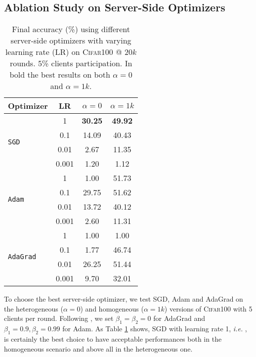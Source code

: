\subsection{Ablation Study on Server-Side Optimizers}
\label{app:server_optims}
\begin{table}[t]\centering
\caption{Final accuracy (\%) using different server-side optimizers with varying learning rate (LR) on \textsc{Cifar100} @ $20k$ rounds. 5\% clients participation. In bold the best results on both $\alpha=0$ and $\alpha=1k$.}\label{tab:server_optim}
\scriptsize
\setlength\tabcolsep{0.5cm}
    \begin{tabular}{lccc}
    \toprule
    Optimizer & LR & $\alpha=0$ & $\alpha=1k$\\
    \midrule
    \multirow{4}{*}{\texttt{SGD}} & 1 &\textbf{30.25}&\textbf{49.92}\\
    & 0.1 & 14.09 & 40.43\\
    & 0.01 & 2.67&11.35\\
    & 0.001 & 1.20 &1.12\\\midrule
    \multirow{4}{*}{\texttt{Adam}} & 1 & 1.00&{51.73}\\
    & 0.1 & 29.75&51.62\\
    & 0.01 & 13.72&40.12\\
    & 0.001 & 2.60&11.31\\\midrule
    \multirow{4}{*}{\texttt{AdaGrad}} & 1 & 1.00 &1.00\\
    & 0.1 & 1.77 &46.74\\
    & 0.01 & 26.25&51.44\\
    & 0.001 & 9.70&32.01\\
    \bottomrule
    \end{tabular}
\end{table} To choose the best server-side optimizer, we test SGD, Adam and AdaGrad on the heterogeneous ($\alpha=0$) and homogeneous ($\alpha=1k$) versions of \textsc{Cifar100} with 5 clients per round. Following \cite{reddi2020adaptive}, we set $\beta_1=\beta_2=0$ for AdaGrad and $\beta_1=0.9, \beta_2=0.99$ for Adam. As Table \ref{tab:server_optim} shows, SGD with learning rate 1, \textit{i.e.} \fedavg, is certainly the best choice to have acceptable performances both in the homogeneous scenario and above all in the heterogeneous one.

